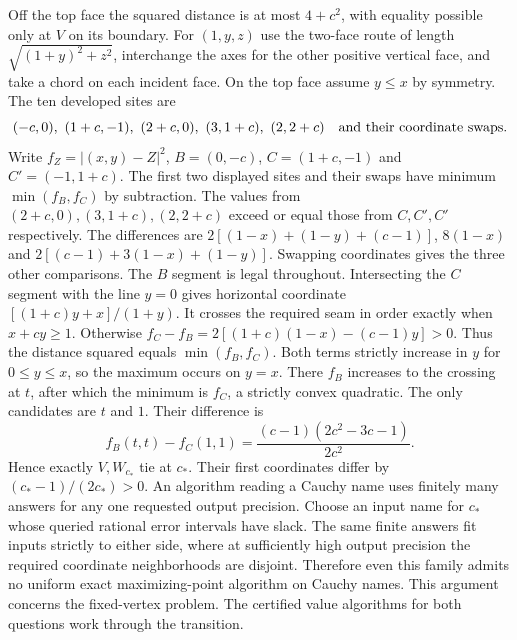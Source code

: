 \documentclass[10pt,letterpaper]{article}
\begin{document}
Off the top face the squared distance is at most $4+c^2$, with
equality possible only at $V$ on its boundary. For $(1,y,z)$ use the
two-face route of length $\sqrt{(1+y)^2+z^2}$, interchange the axes
for the other positive vertical face, and take a chord on each incident
face. On the top face assume $y\le x$ by symmetry. The ten developed
sites are
\[
 (-c,0),\ (1+c,-1),\ (2+c,0),\ (3,1+c),\ (2,2+c)
 \quad\hbox{and their coordinate swaps}.
\]
Write $f_Z=|(x,y)-Z|^2$, $B=(0,-c)$, $C=(1+c,-1)$ and
$C'=(-1,1+c)$. The first two displayed sites and their swaps have
minimum $\min(f_B,f_C)$ by subtraction. The values from
$(2+c,0),(3,1+c),(2,2+c)$ exceed or equal those from $C,C',C'$
respectively. The differences are
$2[(1-x)+(1-y)+(c-1)]$, $8(1-x)$ and
$2[(c-1)+3(1-x)+(1-y)]$. Swapping coordinates gives the three other
comparisons. The $B$ segment is legal throughout. Intersecting the
$C$ segment with the line $y=0$ gives horizontal coordinate
$[(1+c)y+x]/(1+y)$. It crosses the required seam in order exactly
when $x+cy\ge1$. Otherwise
$f_C-f_B=2[(1+c)(1-x)-(c-1)y]>0$.
Thus the distance squared equals $\min(f_B,f_C)$. Both terms strictly
increase in $y$ for $0\le y\le x$, so the maximum occurs on $y=x$.
There $f_B$ increases to the crossing at $t$, after which the minimum
is $f_C$, a strictly convex quadratic. The only candidates are $t$
and $1$. Their difference is
\[
 f_B(t,t)-f_C(1,1)=\frac{(c-1)(2c^2-3c-1)}{2c^2}.
\]
Hence exactly $V,W_{c_*}$ tie at $c_*$. Their first coordinates
differ by $(c_*-1)/(2c_*)>0$. An algorithm reading a Cauchy name
uses finitely many answers for any one requested output precision.
Choose an input name for $c_*$ whose queried rational error intervals
have slack. The same finite answers fit inputs strictly to either
side, where at sufficiently high output precision the required
coordinate neighborhoods are disjoint. Therefore even this family
admits no uniform exact maximizing-point algorithm on Cauchy names.
This argument concerns the fixed-vertex problem. The certified
value algorithms for both questions work through the transition.
\end{document}
